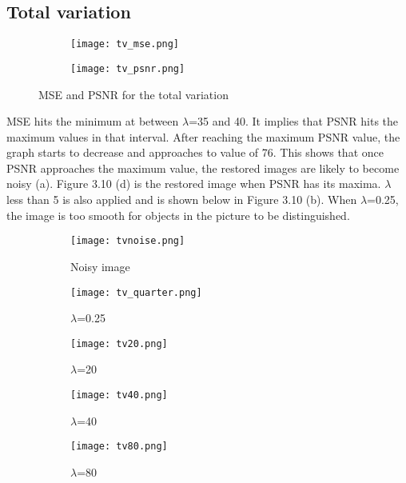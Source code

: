 \documentclass[12pt]{report}
\begin{document}
\begin{tableofcontents}
            \section{Total variation}
			\begin{figure}[H]
				\centering
				\begin{subfigure}{0.49\textwidth}
				\texttt{[image: tv\_mse.png]}
				\end{subfigure}
				\begin{subfigure}{0.49\textwidth}
				\texttt{[image: tv\_psnr.png]}
				\end{subfigure}
				\caption{MSE and PSNR for the total variation}
			\end{figure}
MSE hits the minimum at between $\lambda$=35 and 40. It implies that PSNR hits the maximum values in that interval. After reaching the maximum PSNR value, the graph starts to decrease and approaches to value of 76. This shows that once PSNR approaches the maximum value, the restored images are likely to become noisy (a). Figure 3.10 (d) is the restored image when PSNR has its maxima. $\lambda$ less than 5 is also applied and is shown below in Figure 3.10 (b). When $\lambda$=0.25, the image is too smooth for objects in the picture to be distinguished.
            \begin{figure}[H]
				\centering
				\begin{subfigure}{0.325\textwidth}
					\texttt{[image: tvnoise.png]}
					\caption{Noisy image}
				\end{subfigure}
				\begin{subfigure}{0.325\textwidth}
					\texttt{[image: tv\_quarter.png]}
					\caption{$\lambda$=0.25}
				\end{subfigure}
				\begin{subfigure}{0.325\textwidth}
					\texttt{[image: tv20.png]}
					\caption{$\lambda$=20}
				\end{subfigure}
				\begin{subfigure}{0.325\textwidth}
					\texttt{[image: tv40.png]}
					\caption{$\lambda$=40}
				\end{subfigure}
				\begin{subfigure}{0.325\textwidth}
					\texttt{[image: tv80.png]}
					\caption{$\lambda$=80}
				\end{subfigure}
				\begin{subfigure}{0.325\textwidth}

\end{subfigure}
\end{figure}
\end{tableofcontents}
\end{document}
